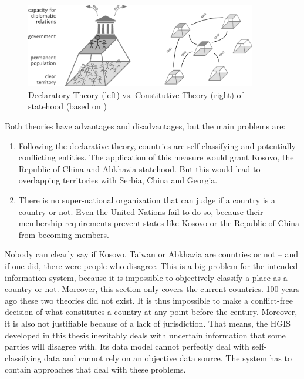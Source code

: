 \begin{figure}[ht]
  \vspace{1em}
  \centering
  \includegraphics[width=0.9\textwidth]{graphics/basics/countries/decl_const_theory}
  \caption{Declaratory Theory (left) vs. Constitutive Theory (right) of statehood (based on \cite{StateTheory})}
  \label{fig:declaratory_constitutive_theory}
\end{figure}

Both theories have advantages and disadvantages, but the main problems are:
\begin{enumerate}
  \item Following the declarative theory, countries are self-classifying and potentially conflicting entities. The application of this measure would grant Kosovo, the Republic of China and Abkhazia statehood. But this would lead to overlapping territories with Serbia, China and Georgia.
  \item There is no super-national organization that can judge if a country is a country or not. Even the United Nations fail to do so, because their membership requirements prevent states like Kosovo or the Republic of China from becoming members.
\end{enumerate}

Nobody can clearly say if Kosovo, Taiwan or Abkhazia are countries or not -- and if one did, there were people who disagree. This is a big problem for the intended information system, because it is impossible to objectively classify a place as a country or not. Moreover, this section only covers the current countries. 100 years ago these two theories did not exist. It is thus impossible to make a conflict-free decision of what constitutes a country at any point before the  century. Moreover, it is also not justifiable because of a lack of jurisdiction. That means, the HGIS developed in this thesis inevitably deals with uncertain information that some parties will disagree with. Its data model cannot perfectly deal with self-classifying data and cannot rely on an objective data source. The system has to contain approaches that deal with these problems.


